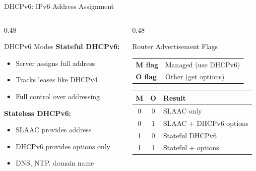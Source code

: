 \documentclass[aspectratio=169, 11pt]{beamer}
\begin{document}
\begin{frame}{DHCPv6: IPv6 Address Assignment}
    \begin{columns}[T]
        \begin{column}{0.48\textwidth}
            \begin{block}{DHCPv6 Modes}
                \small
                \textbf{Stateful DHCPv6:}
                \begin{itemize}\setlength{\itemsep}{1pt}
                    \item Server assigns full address
                    \item Tracks leases like DHCPv4
                    \item Full control over addressing
                \end{itemize}
                
                \vspace{0.2em}
                \textbf{Stateless DHCPv6:}
                \begin{itemize}\setlength{\itemsep}{1pt}
                    \item SLAAC provides address
                    \item DHCPv6 provides options only
                    \item DNS, NTP, domain name
                \end{itemize}
            \end{block}
        \end{column}
        \begin{column}{0.48\textwidth}
            \begin{block}{Router Advertisement Flags}
                \small
                \begin{tabular}{l l}
                    \textbf{M flag} & Managed (use DHCPv6) \\
                    \textbf{O flag} & Other (get options) \\
                \end{tabular}
                
                \vspace{0.3em}
                \footnotesize
                \begin{tabular}{c c l}
                    \textbf{M} & \textbf{O} & \textbf{Result} \\
                    \hline
                    0 & 0 & SLAAC only \\
                    0 & 1 & SLAAC + DHCPv6 options \\
                    1 & 0 & Stateful DHCPv6 \\
                    1 & 1 & Stateful + options \\
                \end{tabular}
            \end{block}
            

\end{column}
\end{columns}
\end{frame}
\end{document}
